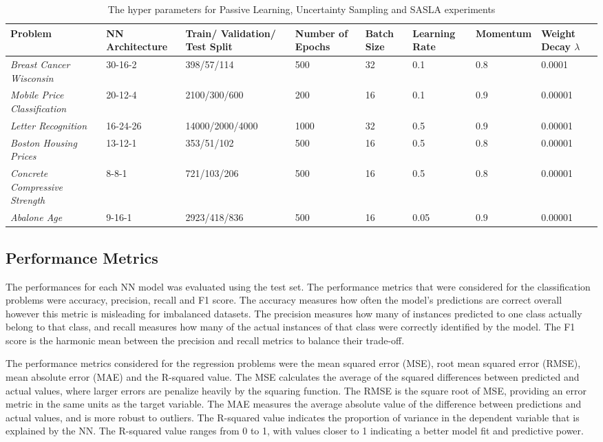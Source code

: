 \documentclass[conference]{IEEEtran}
\begin{document}
	\begin{table}[!t]
		\centering
		\caption{The hyper parameters for Passive Learning, Uncertainty Sampling and SASLA experiments}
		\label{tab:hyperparameters}
		\begin{tabular}{L{3cm}L{1.8cm}L{2.5cm}L{1.5cm}L{1.5cm}L{1.5cm}L{1.5cm}L{1.5cm}}
			\hline
			\textbf{Problem} & \textbf{NN Architecture} & \textbf{Train/ Validation/ Test Split} & \textbf{Number of Epochs} & \textbf{Batch Size} & \textbf{Learning Rate} & \textbf{Momentum} & \textbf{Weight Decay $\lambda$} \\
			\hline
			\textit{Breast Cancer Wisconsin} & 30-16-2 & 398/57/114 & 500 & 32 & 0.1 & 0.8 & 0.0001 \\
			\textit{Mobile Price Classification} & 20-12-4 & 2100/300/600 & 200 & 16 & 0.1 & 0.9 & 0.00001 \\
			\textit{Letter Recognition} & 16-24-26 & 14000/2000/4000 & 1000 & 32 & 0.5 & 0.9 & 0.00001 \\
			\textit{Boston Housing Prices} & 13-12-1 & 353/51/102 & 500 & 16 & 0.5 & 0.8 & 0.00001 \\
			\textit{Concrete Compressive Strength} & 8-8-1 & 721/103/206 & 500 & 16 & 0.5 & 0.8 & 0.00001 \\
			\textit{Abalone Age} & 9-16-1 & 2923/418/836 & 500 & 16 & 0.05 & 0.9 & 0.00001 \\ 
			\hline
		\end{tabular}
	\end{table}
	
	\subsection{Performance Metrics}
	The performances for each NN model was evaluated using the test set. The performance metrics that were considered for the classification problems were accuracy, precision, recall and F1 score. The accuracy measures how often the model's predictions are correct overall however this metric is misleading for imbalanced datasets. The precision measures how many of instances predicted to one class actually belong to that class, and recall measures how many of the actual instances of that class were correctly identified by the model. The F1 score is the harmonic mean between the precision and recall metrics to balance their trade-off.
	
	The performance metrics considered for the regression problems were the mean squared error (MSE), root mean squared error (RMSE), mean absolute error (MAE) and the R-squared value. The MSE calculates the average of the squared differences between predicted and actual values, where larger errors are penalize heavily by the squaring function. The RMSE is the square root of MSE, providing an error metric in the same units as the target variable. The MAE measures the average absolute value of the difference between predictions and actual values, and is more robust to outliers. The R-squared value indicates the proportion of variance in the dependent variable that is explained by the NN. The R-squared value ranges from 0 to 1, with values closer to 1 indicating a better model fit and predictive power.
	
\end{document}
